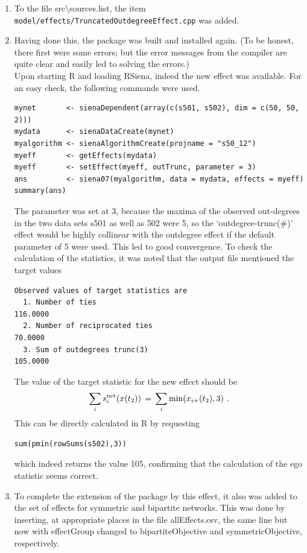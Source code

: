 \documentclass[a4paper,fleqn,11pt]{article}
\newcommand{\+}{\, + \,}
\newcommand{\sfn}[1]{\textsf{#1}}
\newcommand{\R}{{\sf R }}
\newcommand{\rs}{{\sf RSiena}}
\begin{document}
\begin{enumerate}
\item To the file \textsf{src{\textbackslash}sources.list}, the item
      \texttt{model/effects/TruncatedOutdegreeEffect.cpp} was added.
\item Having done this, the package was built and installed again.
      (To be honest, there first were some errors; but the error messages
       from the compiler are quite clear and easily led to solving
       the errors.)\\
      Upon starting \R and loading \rs, indeed the new effect  was
      available. For an easy check, the following commands
      were used.
{\small
\begin{verbatim}
mynet       <- sienaDependent(array(c(s501, s502), dim = c(50, 50, 2)))
mydata      <- sienaDataCreate(mynet)
myalgorithm <- sienaAlgorithmCreate(projname = "s50_12")
myeff       <- getEffects(mydata)
myeff       <- setEffect(myeff, outTrunc, parameter = 3)
ans         <- siena07(myalgorithm, data = mydata, effects = myeff)
summary(ans)
\end{verbatim}
}
      The parameter was set at 3, because the maxima of the
      observed out-degrees
      in the two data sets \sfn{s501} as well as \sfn{502} were 5,
      so the `outdegree-trunc(\#)' effect would be highly collinear with the
      outdegree effect if the default parameter of 5 were used.
      This led to good convergence. To check the calculation of the
      statistics, it was noted that the output file
      mentioned the target values
{\small
\begin{verbatim}
Observed values of target statistics are
  1. Number of ties                                           116.0000
  2. Number of reciprocated ties                               70.0000
  3. Sum of outdegrees trunc(3)                               105.0000
\end{verbatim}
}
      The value of the target statistic for the new effect should be
      \[
       \sum_i s^{\rm net}_{i}(x(t_2)) \,=\,
                         \sum_i \text{min}(x_{i+}(t_2), 3) \ .
      \]
      This can be directly calculated in \R by requesting
\begin{verbatim}
sum(pmin(rowSums(s502),3))
\end{verbatim}
      which indeed returns the value 105, confirming that the calculation
      of the ego statistic seems correct.
\item To complete the extension of the package by this effect,
      it also was added to the set of effects for symmetric
      and bipartite networks.
      This was done by inserting, at appropriate places in the file
      \sfn{allEffects.csv},
      the same line but now with \sfn{effectGroup}
      changed to \sfn{bipartiteObjective} and \sfn{symmetricObjective},
      respectively.
\end{enumerate}
\end{document}
